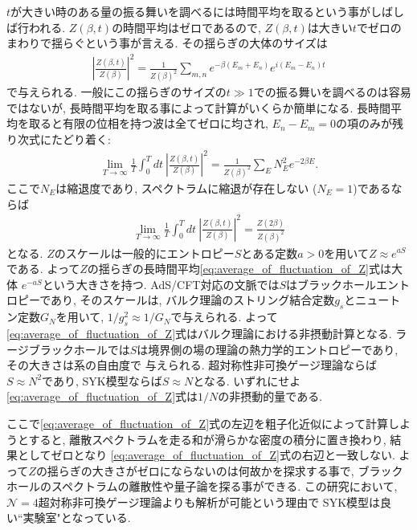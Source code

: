 $t$が大きい時のある量の振る舞いを調べるには時間平均を取るという事がしばしば行われる. 
$Z(\beta, t)$の時間平均はゼロであるので, $Z(\beta, t)$は大きい$t$でゼロのまわりで揺らぐという事が言える. 
その揺らぎの大体のサイズは
\begin{align}
	\left|\frac{Z(\beta, t)}{Z(\beta)}\right|^2
	= \frac{1}{Z(\beta)^2}\sum_{m,n}e^{-\beta(E_m + E_n)}e^{i(E_m - E_n)t}
\end{align}
で与えられる. 
一般にこの揺らぎのサイズの$t \gg 1$での振る舞いを調べるのは容易ではないが, 
長時間平均を取る事によって計算がいくらか簡単になる. 
長時間平均を取ると有限の位相を持つ波は全てゼロに均され, $E_n-E_m = 0$の項のみが残り次式にたどり着く:
\begin{align}
	\lim_{T\to\infty}\frac{1}{T}\int_0^Tdt\ \left|\frac{Z(\beta, t)}{Z(\beta)}\right|^2
	= \frac{1}{Z(\beta)^2}\sum_E N_E^2e^{-2\beta E}.
\end{align}
ここで$N_E$は縮退度であり, スペクトラムに縮退が存在しない ($N_E = 1$)であるならば
\begin{align}
	\lim_{T\to\infty}\frac{1}{T}\int_0^Tdt\ \left|\frac{Z(\beta, t)}{Z(\beta)}\right|^2
	= \frac{Z(2\beta)}{Z(\beta)^2}
	\label{eq:average_of_fluctuation_of_Z}
\end{align} 
となる. 
$Z$のスケールは一般的にエントロピー$S$とある定数$a > 0$を用いて$Z \approx e^{aS}$である. 
よって$Z$の揺らぎの長時間平均\eqref{eq:average_of_fluctuation_of_Z}式は大体
$e^{-aS}$という大きさを持つ. 
AdS/CFT対応の文脈では$S$はブラックホールエントロピーであり, そのスケールは, 
バルク理論のストリング結合定数$g_s$とニュートン定数$G_N$を用いて, $1/g_s^2 \approx 1/G_N$で与えられる. 
よって\eqref{eq:average_of_fluctuation_of_Z}式はバルク理論における非摂動計算となる. 
ラージブラックホールでは$S$は境界側の場の理論の熱力学的エントロピーであり, その大きさは系の自由度で
与えられる. 
超対称性非可換ゲージ理論ならば$S\approx N^2$であり, SYK模型ならば$S\approx N$となる. 
いずれにせよ\eqref{eq:average_of_fluctuation_of_Z}式は$1/N$の非摂動的量である. 

ここで\eqref{eq:average_of_fluctuation_of_Z}式の左辺を粗子化近似によって計算しようとすると, 
離散スペクトラムを走る和が滑らかな密度の積分に置き換わり, 結果としてゼロとなり
\eqref{eq:average_of_fluctuation_of_Z}式の右辺と一致しない. 
よって$Z$の揺らぎの大きさがゼロにならないのは何故かを探求する事で, 
ブラックホールのスペクトラムの離散性や量子論を探る事ができる. 
この研究において, $\mathcal{N}=4$超対称非可換ゲージ理論よりも解析が可能という理由で
SYK模型は良い``実験室"となっている. 

